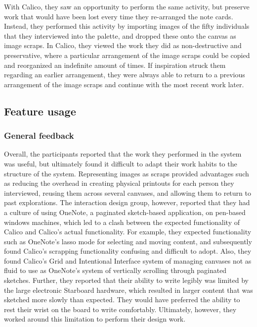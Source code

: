 \documentclass[12pt,fleqn]{ucithesis}
\begin{document}
With Calico, they saw an opportunity to perform the same activity, but preserve work that would have been lost every time they re-arranged the note cards. Instead, they performed this activity by importing images of the fifty individuals that they interviewed into the palette, and dropped these onto the canvas as image scraps. In Calico, they viewed the work they did as non-destructive and preservative, where a particular arrangement of the image scraps could be copied and reorganized an indefinite amount of times. If inspiration struck them regarding an earlier arrangement, they were always able to return to a previous arrangement of the image scraps and continue with the most recent work later.

\subsection{Feature usage}

\subsubsection{General feedback}

Overall, the participants reported that the work they performed in the system was useful, but ultimately found it difficult to adapt their work habits to the structure of the system. Representing images as scraps provided advantages such as reducing the overhead in creating physical printouts for each person they interviewed, reusing them across several canvases, and allowing them to return to past explorations. The interaction design group, however, reported that they had a culture of using OneNote, a paginated sketch-based application, on pen-based windows machines, which led to a clash between the expected functionality of Calico and Calico's actual functionality. For example, they expected functionality such as OneNote's lasso mode for selecting and moving content, and subsequently found Calico's scrapping functionality confusing and difficult to adopt. Also, they found Calico's Grid and Intentional Interface system of managing canvases not as fluid to use as OneNote's system of vertically scrolling through paginated sketches. Further, they reported that their ability to write legibly was limited by the large electronic Starboard hardware, which resulted in larger content that was sketched more slowly than expected. They would have preferred the ability to rest their wrist on the board to write comfortably. Ultimately, however, they worked around this limitation to perform their design work.
\end{document}
